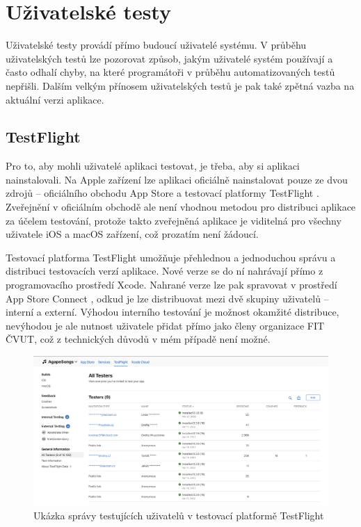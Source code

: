\section{Uživatelské testy}

Uživatelské testy provádí přímo budoucí uživatelé systému. V průběhu uživatelských testů lze pozorovat způsob, jakým uživatelé systém používají a často odhalí chyby, na které programátoři v průběhu automatizovaných testů nepřišli. Dalším velkým přínosem uživatelských testů je pak také zpětná vazba na aktuální verzi aplikace.

\subsection{TestFlight}

Pro to, aby mohli uživatelé aplikaci testovat, je třeba, aby si aplikaci nainstalovali. Na Apple zařízení lze aplikaci oficiálně nainstalovat pouze ze dvou zdrojů -- oficiálního obchodu App Store \cite{app-store} a testovací platformy TestFlight \cite{testflight}. Zveřejnění v oficiálním obchodě ale není vhodnou metodou pro distribuci aplikace za účelem testování, protože takto zveřejněná aplikace je viditelná pro všechny uživatele iOS a macOS zařízení, což prozatím není žádoucí.

Testovací platforma TestFlight umožňuje přehlednou a jednoduchou správu a distribuci testovacích verzí aplikace. Nové verze se do ní nahrávají přímo z programovacího prostředí Xcode. Nahrané verze lze pak spravovat v prostředí App Store Connect \cite{app-store-connect}, odkud je lze distribuovat mezi dvě skupiny uživatelů -- interní a externí. Výhodou interního testování je možnost okamžité distribuce, nevýhodou je ale nutnost uživatele přidat přímo jako členy organizace FIT ČVUT, což z technických důvodů v mém případě není možné.

\begin{figure}[H]
    \includegraphics[width=\textwidth]{images/6-testovani/6-4-testflight-uzivatele.png}
    \caption{Ukázka správy testujících uživatelů v testovací platformě TestFlight}
\end{figure}

